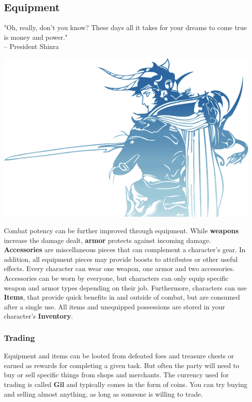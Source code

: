 \subsection*{Equipment}
%
"Oh, really, don't you know? These days all it takes for your dreams to come true is money and power."\\   
\indent -- President Shinra
%
\vfill
%
\begin{center} \includegraphics[width=\columnwidth]{./art/images/ff1.png} \end{center}
%
Combat potency can be further improved through \hypertarget{equip}{equipment}. 
While \textbf{weapons} increase the damage dealt, \textbf{armor} protects against incoming damage.
\textbf{Accessories} are miscellaneous pieces that can complement a character's gear.
In addition, all equipment pieces may provide boosts to attributes or other useful effects. 
Every character can wear one weapon, one armor and two accessories. 
Accessories can be worn by everyone, but characters can only equip specific weapon and armor types depending on their job.
Furthermore, characters can use \textbf{Items}, that provide quick benefits in and outside of combat, but are consumed after a single use.
All items and unequipped possessions are stored in your character's \textbf{Inventory}.
%
\vspace{0.5cm}
%
\subsubsection*{Trading}
Equipment and items can be looted from defeated foes and treasure chests or earned as rewards for completing a given task. 
But often the party will need to buy or sell specific things from shops and merchants. 
The currency used for trading is called \textbf{Gil} and typically comes in the form of coins.
You can try buying and selling almost anything, as long as someone is willing to trade.
%
\vfill
%
%
\pagebreak
%

